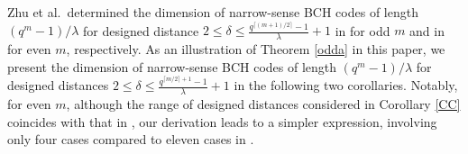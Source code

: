 \documentclass[journal,onecolumn]{IEEEtran}
\begin{document}
Zhu et al.\ determined the dimension of narrow-sense BCH codes of length $(q^m-1)/\lambda$ for designed distance $2\leq \delta\leq \frac{q^{\lceil (m+1)/2 \rceil}-1}{\lambda} + 1$ in \cite[Theorem 1]{ZSK2019} for odd $m$ and in \cite[Theorem 3]{ZSK2019} for even  $m$, respectively.
As an illustration of   Theorem \ref{odda} in this paper, we present the dimension of narrow-sense BCH codes of length $(q^m-1)/\lambda$ for  designed distances  $2\leq \delta \leq \frac{q^{\lceil m/2\rceil+1}-1}{\lambda}+1$ in the following two corollaries. 
Notably, for even $m$,  although the range of designed distances considered in Corollary  \ref{CC} coincides with that in
 \cite[Theorem 3]{ZSK2019}, our derivation leads to a simpler expression, involving only four cases compared to  eleven cases in \cite[Theorem 3]{ZSK2019}.
\end{document}
